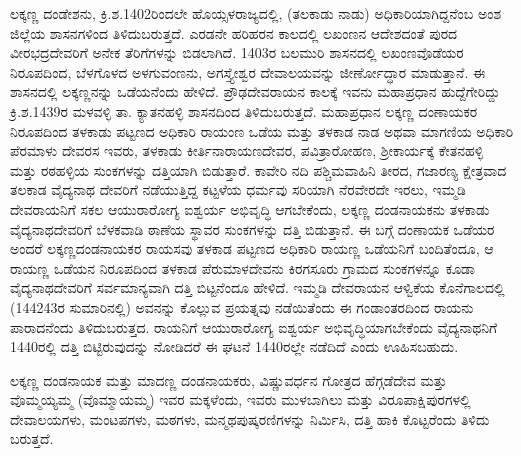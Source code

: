 \newpage

ಲಕ್ಕಣ್ಣ ದಂಡೇಶನು, ಕ್ರಿ.ಶ.1402ರಿಂದಲೇ ಹೊಯ್ಸಳರಾಜ್ಯದಲ್ಲಿ, (ತಲಕಾಡು ನಾಡು) ಅಧಿಕಾರಿಯಾಗಿದ್ದನೆಂಬ ಅಂಶ ಜಿಲ್ಲೆಯ ಶಾಸನಗಳಿಂದ ತಿಳಿದುಬರುತ್ತದೆ. ಎರಡನೇ ಹರಿಹರನ ಕಾಲದಲ್ಲಿ ಲಖಂಣನ ಆದೇಶದಂತೆ ಪುರದ ವೀರಭದ್ರದೇವರಿಗೆ ಅನೇಕ ತೆರಿಗೆಗಳನ್ನು ಬಿಡಲಾಗಿದೆ. 1403ರ ಬಲಮುರಿ ಶಾಸನದಲ್ಲಿ ಲಖಂಣವೊಡೆಯರ ನಿರೂಪದಿಂದ, ಬೆಳಗೊಳದ ಅಳಗುವಂಣನು, ಅಗಸ್ತ್ಯೇಶ್ವರ ದೇವಾಲಯವನ್ನು ಜೀರ್ಣೋದ್ಧಾರ ಮಾಡುತ್ತಾನೆ. ಈ ಶಾಸನದಲ್ಲಿ ಲಕ್ಕಣ್ಣನನ್ನು ಒಡೆಯನೆಂದು ಹೇಳಿದೆ. ಪ್ರೌಢದೇವರಾಯನ ಕಾಲಕ್ಕೆ ಇವನು ಮಹಾಪ್ರಧಾನ ಹುದ್ದೆಗೇರಿದ್ದು ಕ್ರಿ.ಶ.1439ರ ಮಳವಳ್ಳಿ ತಾ. ಕ್ಯಾತನಹಳ್ಳಿ ಶಾಸನದಿಂದ ತಿಳಿದುಬರುತ್ತದೆ. ಮಹಾಪ್ರಧಾನ ಲಕ್ಕಣ್ಣ ದಂಣಾಯಕರ ನಿರೂಪದಿಂದ ತಳಕಾಡು ಪಟ್ಟಣದ ಅಧಿಕಾರಿ ರಾಯಂಣ ಒಡೆಯ ಮತ್ತು ತಳಕಾಡ ನಾಡ ಅಥವಾ ಮಾಗಣಿಯ ಅಧಿಕಾರಿ ಪೆರಮಾಳು ದೇವರಸ ಇವರು, ತಳಕಾಡು ಕೀರ್ತಿನಾರಾಯಣದೇವರ, ಪವಿತ್ರಾರೋಹಣ, ಶ‍್ರೀಕಾರ್ಯಕ್ಕೆ ಕೇತನಹಳ್ಳಿ ಮತ್ತು ರಠಹಳ್ಳಿಯ ಸುಂಕಗಳನ್ನು ದತ್ತಿಯಾಗಿ ಬಿಡುತ್ತಾರೆ. ಕಾವೇರಿ ನದಿ ಪಶ್ಚಿಮವಾಹಿನಿ ತೀರದ, ಗಜಾರಣ್ಯ ಕ್ಷೇತ್ರವಾದ ತಲಕಾಡ ವೈದ್ಯನಾಥ ದೇವರಿಗೆ ನಡೆಯುತ್ತಿದ್ದ ಕಟ್ಟಳೆಯ ಧರ್ಮವು ಸರಿಯಾಗಿ ನೆರವೇರದೇ ಇರಲು, ಇಮ್ಮಡಿ ದೇವರಾಯನಿಗೆ ಸಕಲ ಆಯುರಾರೋಗ್ಯ ಐಶ್ವರ್ಯ ಅಭಿವೃದ್ಧಿ ಆಗಬೇಕೆಂದು, ಲಕ್ಕಣ್ಣ ದಂಡನಾಯಕನು ತಳಕಾಡು ವೈದ್ಯನಾಥದೇವರಿಗೆ ಬೆಳಕವಾಡಿ ಠಾಣೆಯ ಸ್ಥಾವರ ಸುಂಕಗಳನ್ನು ದತ್ತಿ ಬಿಡುತ್ತಾನೆ. ಈ ಬಗ್ಗೆ ದಂಣಾಯಕ ಒಡೆಯರ ಅಂದರೆ ಲಕ್ಕಣ್ಣದಂಡನಾಯಕರ ರಾಯಸವು ತಳಕಾಡ ಪಟ್ಟಣದ ಅಧಿಕಾರಿ ರಾಯಣ್ಣ ಒಡೆಯನಿಗೆ ಬಂದಿತೆಂದೂ, ಆ ರಾಯಣ್ಣ ಒಡೆಯನ ನಿರೂಪದಿಂದ ತಳಕಾಡ ಪೆರುಮಾಳದೇವನು ಕಿರಗಸೂರು ಗ್ರಾಮದ ಸುಂಕಗಳನ್ನೂ ಕೂಡಾ ವೈದ್ಯನಾಥದೇವರಿಗೆ ಸರ್ವಮಾನ್ಯವಾಗಿ ದತ್ತಿ ಬಿಟ್ಟನೆಂದೂ ಹೇಳಿದೆ. ಇಮ್ಮಡಿ ದೇವರಾಯನ ಆಳ್ವಿಕೆಯ ಕೊನೆಗಾಲದಲ್ಲಿ (1442\enginline{-}43ರ ಸುಮಾರಿನಲ್ಲಿ) ಅವನನ್ನು ಕೊಲ್ಲುವ ಪ್ರಯತ್ನವು ನಡೆಯಿತೆಂದು ಈ ಗಂಡಾಂತರದಿಂದ ರಾಯನು ಪಾರಾದನೆಂದು ತಿಳಿದುಬರುತ್ತದ. ರಾಯನಿಗೆ ಆಯುರಾರೋಗ್ಯ ಐಶ್ವರ್ಯ ಅಭಿವೃದ್ಧಿಯಾಗಬೇಕೆಂದು ವೈದ್ಯನಾಥನಿಗೆ 1440ರಲ್ಲಿ ದತ್ತಿ ಬಿಟ್ಟಿರುವುದನ್ನು ನೋಡಿದರೆ ಈ ಘಟನೆ 1440ರಲ್ಲೇ ನಡೆದಿದೆ ಎಂದು ಊಹಿಸಬಹುದು.

ಲಕ್ಕಣ್ಣ ದಂಡನಾಯಕ ಮತ್ತು ಮಾದಣ್ಣ ದಂಡನಾಯಕರು, ವಿಷ್ಣುವರ್ಧನ ಗೋತ್ರದ ಹೆಗ್ಗಡೆದೇವ ಮತ್ತು ವೊಮ್ಮಯ್ಯಮ್ಮ (ವೊಮ್ಮಾಯಮ್ಮ) ಇವರ ಮಕ್ಕಳೆಂದು, ಇವರು ಮುಳಬಾಗಿಲು ಮತ್ತು ವಿರೂಪಾಕ್ಷಿಪುರಗಳಲ್ಲಿ ದೇವಾಲಯಗಳು, ಮಂಟಪಗಳು, ಮಠಗಳು, ಮನ್ಮಥಪುಷ್ಕರಣಿಗಳನ್ನು ನಿರ್ಮಿಸಿ, ದತ್ತಿ ಹಾಕಿ ಕೊಟ್ಟರೆಂದು ತಿಳಿದು ಬರುತ್ತದೆ.

